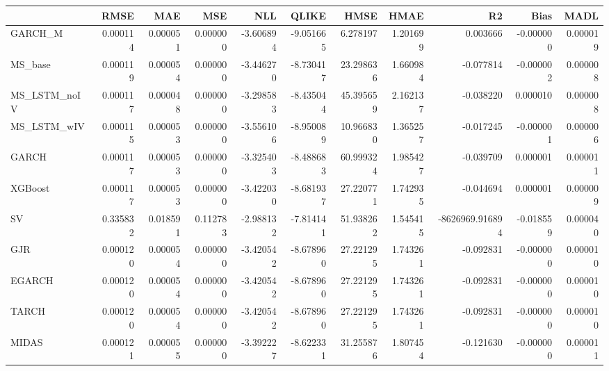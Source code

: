 \begin{tabular}{lrrrrrrrrrr}
\toprule
 & RMSE & MAE & MSE & NLL & QLIKE & HMSE & HMAE & R2 & Bias & MADL \\
\midrule
GARCH_M & 0.000114 & 0.000051 & 0.000000 & -3.606894 & -9.051665 & 6.278197 & 1.201699 & 0.003666 & -0.000000 & 0.000019 \\
MS_base & 0.000119 & 0.000054 & 0.000000 & -3.446270 & -8.730417 & 23.298636 & 1.660984 & -0.077814 & -0.000002 & 0.000008 \\
MS_LSTM_noIV & 0.000117 & 0.000048 & 0.000000 & -3.298583 & -8.435044 & 45.395659 & 2.162137 & -0.038220 & 0.000010 & 0.000008 \\
MS_LSTM_wIV & 0.000115 & 0.000053 & 0.000000 & -3.556106 & -8.950089 & 10.966830 & 1.365257 & -0.017245 & -0.000001 & 0.000006 \\
GARCH & 0.000117 & 0.000053 & 0.000000 & -3.325403 & -8.488683 & 60.999324 & 1.985427 & -0.039709 & 0.000001 & 0.000011 \\
XGBoost & 0.000117 & 0.000053 & 0.000000 & -3.422030 & -8.681937 & 27.220771 & 1.742935 & -0.044694 & 0.000001 & 0.000009 \\
SV & 0.335832 & 0.018591 & 0.112783 & -2.988132 & -7.814141 & 51.938262 & 1.545415 & -8626969.916894 & -0.018559 & 0.000040 \\
GJR & 0.000120 & 0.000054 & 0.000000 & -3.420542 & -8.678960 & 27.221295 & 1.743261 & -0.092831 & -0.000000 & 0.000010 \\
EGARCH & 0.000120 & 0.000054 & 0.000000 & -3.420542 & -8.678960 & 27.221295 & 1.743261 & -0.092831 & -0.000000 & 0.000010 \\
TARCH & 0.000120 & 0.000054 & 0.000000 & -3.420542 & -8.678960 & 27.221295 & 1.743261 & -0.092831 & -0.000000 & 0.000010 \\
MIDAS & 0.000121 & 0.000055 & 0.000000 & -3.392227 & -8.622331 & 31.255876 & 1.807454 & -0.121630 & -0.000000 & 0.000011 \\
\bottomrule
\end{tabular}
